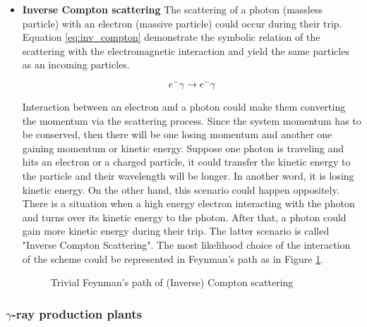 \begin{itemize}
    \item \textbf{Inverse Compton scattering}
    The scattering of a photon (massless particle) with an electron 
    (massive particle) could occur during their trip. Equation \ref{eq:inv_compton} 
    demonstrate the symbolic relation of the scattering with the 
    electromagnetic interaction and yield the same particles as an 
    incoming particles.

    \begin{equation}
        e^-\gamma \rightarrow e^-\gamma
        \label{eq:inv_compton}
    \end{equation}

    Interaction between an electron and a photon could make them converting the momentum via the scattering process. Since the system momentum has to be conserved,
    then there will be one losing momentum and another one gaining momentum or kinetic energy. Suppose one photon is traveling and hits an electron or a charged particle, it could transfer the kinetic energy to the particle and their wavelength will be longer. In another word, it is losing kinetic energy.
    On the other hand, this scenario could happen oppositely.
    There is a situation when a high energy electron interacting with the photon and turns over its kinetic energy to the photon. After that,
    a photon could gain more kinetic energy during their trip. 
    The latter scenario is called "Inverse Compton Scattering".
    The most likelihood choice of the interaction of the scheme could be represented in Feynman's path as in Figure \ref{fig:compton_feynman}.

    \begin{figure}[h!]
        \centering
            \hfill
            \caption{Trivial Feynman's path of (Inverse) Compton scattering}
           \label{fig:compton_feynman}
    \end{figure}
\end{itemize}




\subsubsection{$\gamma$-ray production plants}



